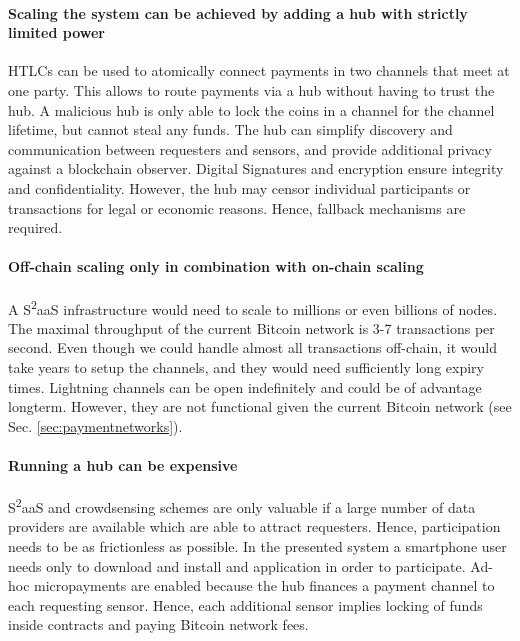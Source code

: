 \paragraph{Scaling the system can be achieved by adding a hub with strictly limited power}

\ac{HTLC}s can be used to atomically connect payments in two channels that meet at one party. This allows to route payments via a hub without having to trust the hub. A malicious hub is only able to lock the coins in a channel for the channel lifetime, but cannot steal any funds. The hub can simplify discovery and communication between requesters and sensors, and provide additional privacy against a blockchain observer. Digital Signatures and encryption ensure integrity and confidentiality. However, the hub may censor individual participants or transactions for legal or economic reasons. Hence, fallback mechanisms are required.

\paragraph{Off-chain scaling only in combination with on-chain scaling}

A S\textsuperscript{2}aaS infrastructure would need to scale to millions or even billions of nodes. The maximal throughput of the current Bitcoin network is 3-7 transactions per second. Even though we could handle almost all transactions off-chain, it would take years to setup the channels, and they would need sufficiently long expiry times. 
Lightning channels \parencite{poonbitcoin} can be open indefinitely and could be of advantage longterm. However, they are not functional given the current Bitcoin network (see Sec. \ref{sec:paymentnetworks}).

\paragraph{Running a hub can be expensive}

S\textsuperscript{2}aaS and crowdsensing schemes are only valuable if a large number of data providers are available which are able to attract requesters. Hence, participation needs to be as frictionless as possible. In the presented system a smartphone user needs only to download and install and application in order to participate. Ad-hoc micropayments are enabled because the hub finances a payment channel to each requesting sensor. Hence, each additional sensor implies locking of funds inside contracts and paying Bitcoin network fees.

